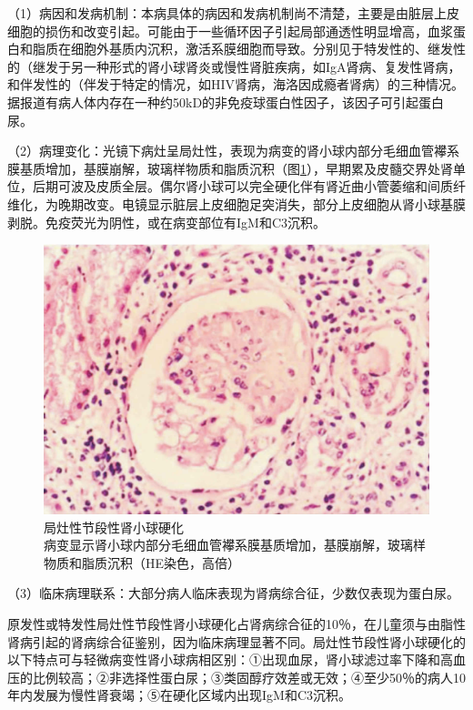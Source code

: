 （1）病因和发病机制：本病具体的病因和发病机制尚不清楚，主要是由脏层上皮细胞的损伤和改变引起。可能由于一些循环因子引起局部通透性明显增高，血浆蛋白和脂质在细胞外基质内沉积，激活系膜细胞而导致。分别见于特发性的、继发性的（继发于另一种形式的肾小球肾炎或慢性肾脏疾病，如IgA肾病、复发性肾病，和伴发性的（伴发于特定的情况，如HIV肾病，海洛因成瘾者肾病）的三种情况。据报道有病人体内存在一种约50kD的非免疫球蛋白性因子，该因子可引起蛋白尿。

（2）病理变化：光镜下病灶呈局灶性，表现为病变的肾小球内部分毛细血管襻系膜基质增加，基膜崩解，玻璃样物质和脂质沉积（图\ref{fig10-19}），早期累及皮髓交界处肾单位，后期可波及皮质全层。偶尔肾小球可以完全硬化伴有肾近曲小管萎缩和间质纤维化，为晚期改变。电镜显示脏层上皮细胞足突消失，部分上皮细胞从肾小球基膜剥脱。免疫荧光为阴性，或在病变部位有IgM和C3沉积。

\begin{figure}[!htbp]
 \centering
 \includegraphics{./images/Image00167.jpg}
 \captionsetup{justification=centering}
 \caption{局灶性节段性肾小球硬化\\ {\small 病变显示肾小球内部分毛细血管襻系膜基质增加，基膜崩解，玻璃样物质和脂质沉积（HE染色，高倍）}}
\label{fig10-19}
  \end{figure}

（3）临床病理联系：大部分病人临床表现为肾病综合征，少数仅表现为蛋白尿。

原发性或特发性局灶性节段性肾小球硬化占肾病综合征的10％，在儿童须与由脂性肾病引起的肾病综合征鉴别，因为临床病理显著不同。局灶性节段性肾小球硬化的以下特点可与轻微病变性肾小球病相区别：①出现血尿，肾小球滤过率下降和高血压的比例较高；②非选择性蛋白尿；③类固醇疗效差或无效；④至少50％的病人10年内发展为慢性肾衰竭；⑤在硬化区域内出现IgM和C3沉积。


